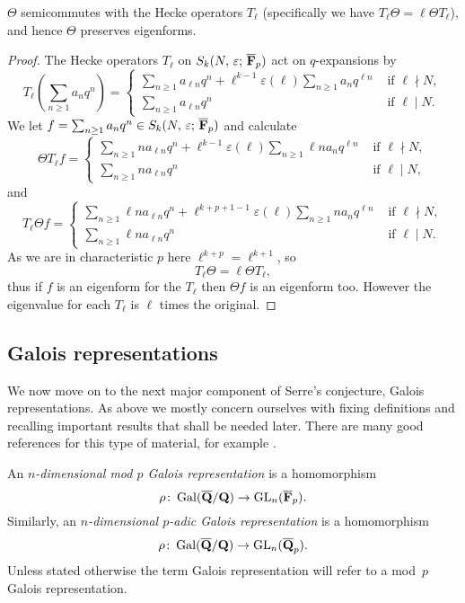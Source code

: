 \documentclass[a4paper,12pt]{article}
\begin{document}
\begin{prop}\label{prop:thetaeigen}
$\Theta$ semicommutes with the Hecke operators $T_{\ell}$ (specifically we have $T_{\ell}\Theta = \ell\Theta T_{\ell}$), and hence $\Theta$ preserves eigenforms.
\end{prop}
\begin{proof}
The Hecke operators $T_{\ell}$ on $S_k(N,\,\varepsilon;\,\overline{\mathbf{F}}_p)$ act on $q$-expansions by
\[
T_{\ell}\left(\sum_{n\ge 1} a_nq^n\right) = \begin{cases}
\sum_{n\ge 1} a_{\ell n}q^n + \ell^{k-1}\varepsilon(\ell)\sum_{n\ge 1} a_{n}q^{\ell n} &\text{ if }\ell \nmid N,\\
\sum_{n\ge 1} a_{\ell n}q^n &\text{ if }\ell \mid N.
\end{cases}
\]
We let $f = \sum_{n\ge 1} a_nq^n\in S_k(N,\,\varepsilon;\,\overline{\mathbf{F}}_p)$ and calculate
\[
\Theta T_{\ell} f = \begin{cases}
\sum_{n\ge 1} na_{\ell n}q^n + \ell^{k-1}\varepsilon(\ell)\sum_{n\ge 1} \ell n a_{n}q^{\ell n} &\text{ if }\ell \nmid N,\\
\sum_{n\ge 1} na_{\ell n}q^n &\text{ if }\ell \mid N,
\end{cases}
\]
and
\[
T_{\ell}\Theta f = \begin{cases}
\sum_{n\ge 1} \ell n a_{\ell n}q^n + \ell^{k+p+1-1} \varepsilon(\ell)\sum_{n\ge 1} n a_{n}q^{\ell n} &\text{ if }\ell \nmid N,\\
\sum_{n\ge 1} \ell n a_{\ell n}q^n &\text{ if }\ell \mid N.
\end{cases}
\]
As we are in characteristic $p$ here $\ell^{k+p} = \ell^{k+1}$, so
\[
 T_{\ell} \Theta = \ell \Theta T_{\ell},
\]
thus if $f$ is an eigenform for the $T_\ell$ then $\Theta f$ is an eigenform too.
However the eigenvalue for each $T_\ell$ is $\ell$ times the original.
\end{proof}


\subsection{Galois representations}\label{sec:gals}
We now move on to the next major component of Serre's conjecture, Galois representations.
As above we mostly concern ourselves with fixing definitions and recalling important results that shall be needed later.
There are many good references for this type of material, for example \cite{DDT,WieseGal}. %

\begin{defn}
An \emph{$n$-dimensional mod $p$ Galois representation} is a homomorphism
\[
\rho\colon \operatorname{Gal}(\overline{\mathbf{Q}}/\mathbf{Q}) \to \operatorname{GL}_n(\overline{\mathbf{F}}_p).
\]
Similarly, an \emph{$n$-dimensional $p$-adic Galois representation} is a homomorphism
\[
\rho\colon \operatorname{Gal}(\overline{\mathbf{Q}}/\mathbf{Q}) \to \operatorname{GL}_n(\overline{\mathbf{Q}}_p).
\]
Unless stated otherwise the term Galois representation will refer to a mod~$p$ Galois representation.
\end{defn}
\end{document}
